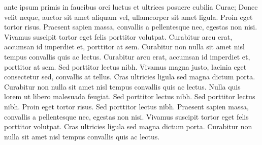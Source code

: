 \documentclass{article}
\begin{document}
ante ipsum primis in faucibus orci luctus et ultrices posuere cubilia Curae; Donec velit neque, auctor sit amet aliquam vel, ullamcorper sit amet ligula. Proin eget tortor risus. Praesent sapien massa, convallis a pellentesque nec, egestas non nisi. Vivamus suscipit tortor eget felis porttitor volutpat. Curabitur arcu erat, accumsan id imperdiet et, porttitor at sem. Curabitur non nulla sit amet nisl tempus convallis quis ac lectus. Curabitur arcu erat, accumsan id imperdiet et, porttitor at sem. Sed porttitor lectus nibh. Vivamus magna justo, lacinia eget consectetur sed, convallis at tellus. Cras ultricies ligula sed magna dictum porta. Curabitur non nulla sit amet nisl tempus convallis quis ac lectus. Nulla quis lorem ut libero malesuada feugiat. Sed porttitor lectus nibh. Sed porttitor lectus nibh. Proin eget tortor risus. Sed porttitor lectus nibh. Praesent sapien massa, convallis a pellentesque nec, egestas non nisi. Vivamus suscipit tortor eget felis porttitor volutpat. Cras ultricies ligula sed magna dictum porta. Curabitur non nulla sit amet nisl tempus convallis quis ac lectus.
\end{document}

